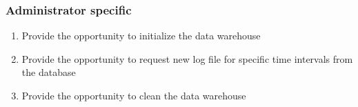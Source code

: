 \subsubsection*{Administrator specific}

\begin{enumerate}[resume*=func]
   
  \item Provide the opportunity to initialize the \gls{data warehouse} \label{f27}
   
  \item Provide the opportunity to request new \gls{log file} for specific time intervals
  	from the \gls{database} \label{f28}
  
  \item Provide the opportunity to clean the \gls{data warehouse} \label{f29}
   
\end{enumerate}


